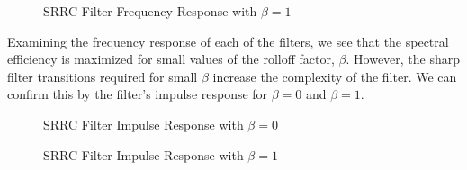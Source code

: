 \documentclass{article}
\begin{document}
\begin{figure}[H]
	\centerline{}
	\caption{SRRC Filter Frequency Response with $\beta=1$}
	\label{fig::srrc_freq_response_beta_1}
\end{figure}

\noindent Examining the frequency response of each of the filters, we see that the spectral efficiency is maximized for small values of the rolloff factor, $\beta$. However, the sharp filter transitions required for small $\beta$ increase the complexity of the filter. We can confirm this by the filter's impulse response for $\beta=0$ and $\beta=1$.

\begin{figure}[H]
	\centerline{}
	\caption{SRRC Filter Impulse Response with $\beta=0$}
	\label{fig::srrc_impulse_response_beta_0}
\end{figure}

\begin{figure}[H]
	\centerline{}
	\caption{SRRC Filter Impulse Response with $\beta=1$}
	\label{fig::srrc_impulse_response_beta_1}
\end{figure}
\end{document}
